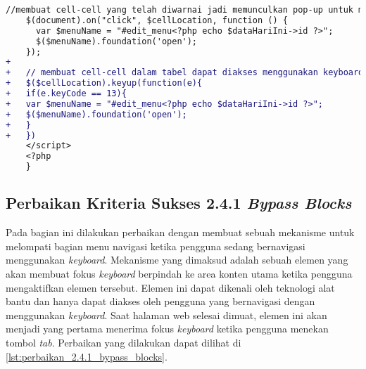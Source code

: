 \begin{itemize}
\begin{lstlisting}[frame=single, label={lst:perbaikan_2.1.1_keyboard_entri_jadwal_dosen}, language=diff, caption=Perbaikan Kriteria Sukses 2.1.1 - Penggunaan \textit{Keyboard} pada Halaman Entri Jadwal Dosen]
    //membuat cell-cell yang telah diwarnai jadi memunculkan pop-up untuk mengedit jadwal ketika diklik oleh mouse
    $(document).on("click", $cellLocation, function () {
      var $menuName = "#edit_menu<?php echo $dataHariIni->id ?>";
      $($menuName).foundation('open');
    });
+
+   // membuat cell-cell dalam tabel dapat diakses menggunakan keyboard
+   $($cellLocation).keyup(function(e){
+   if(e.keyCode == 13){
+   var $menuName = "#edit_menu<?php echo $dataHariIni->id ?>";
+   $($menuName).foundation('open');
+   }
+   })
    </script>
    <?php
    }
\end{lstlisting}
\end{itemize}

\subsection{Perbaikan Kriteria Sukses 2.4.1 \textit{Bypass Blocks}}
\label{subsec:perbaikan_kriteria_sukses_2.4.1}
Pada bagian ini dilakukan perbaikan dengan membuat sebuah mekanisme untuk melompati bagian menu navigasi ketika pengguna sedang bernavigasi menggunakan \textit{keyboard}. Mekanisme yang dimaksud adalah sebuah elemen yang akan membuat fokus \textit{keyboard} berpindah ke area konten utama ketika pengguna mengaktifkan elemen tersebut. Elemen ini dapat dikenali oleh teknologi alat bantu dan hanya dapat diakses oleh pengguna yang bernavigasi dengan menggunakan \textit{keyboard}. Saat halaman web selesai dimuat, elemen ini akan menjadi yang pertama menerima fokus \textit{keyboard} ketika pengguna menekan tombol \textit{tab}. Perbaikan yang dilakukan dapat dilihat di \ref{lst:perbaikan_2.4.1_bypass_blocks}.
